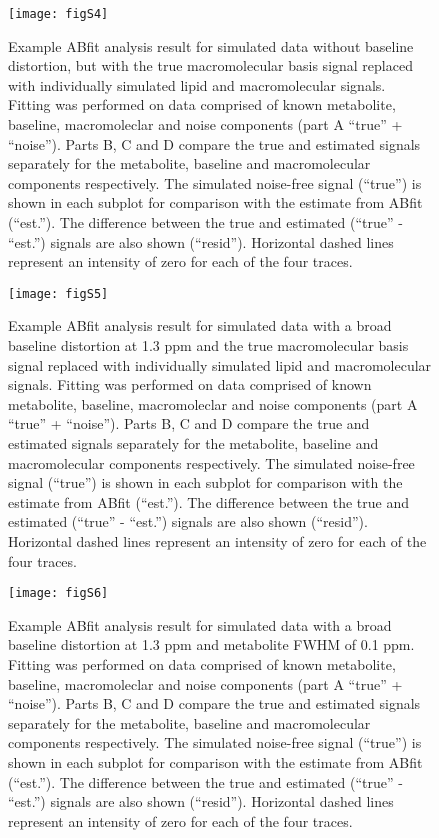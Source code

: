 \documentclass[num-refs]{wiley-article}
\begin{document}
\begin{figure}
  \begin{center}
    \texttt{[image: figS4]}
    \caption{Example ABfit analysis result for simulated data without baseline distortion, but with the true macromolecular basis signal replaced with individually simulated lipid and macromolecular signals. Fitting was performed on data comprised of known metabolite, baseline, macromoleclar and noise components (part A ``true'' + ``noise''). Parts B, C and D compare the true and estimated signals separately for the metabolite, baseline and macromolecular components respectively. The simulated noise-free signal (``true'') is shown in each subplot for comparison with the estimate from ABfit (``est.''). The difference between the true and estimated (``true'' - ``est.'') signals are also shown (``resid''). Horizontal dashed lines represent an intensity of zero for each of the four traces.}
  \end{center}
\end{figure}

\begin{figure}
  \begin{center}
    \texttt{[image: figS5]}
    \caption{Example ABfit analysis result for simulated data with a broad baseline distortion at 1.3 ppm and the true macromolecular basis signal replaced with individually simulated lipid and macromolecular signals. Fitting was performed on data comprised of known metabolite, baseline, macromoleclar and noise components (part A ``true'' + ``noise''). Parts B, C and D compare the true and estimated signals separately for the metabolite, baseline and macromolecular components respectively. The simulated noise-free signal (``true'') is shown in each subplot for comparison with the estimate from ABfit (``est.''). The difference between the true and estimated (``true'' - ``est.'') signals are also shown (``resid''). Horizontal dashed lines represent an intensity of zero for each of the four traces.}
  \end{center}
\end{figure}

\begin{figure}
  \begin{center}
    \texttt{[image: figS6]}
    \caption{Example ABfit analysis result for simulated data with a broad baseline distortion at 1.3 ppm and metabolite FWHM of 0.1 ppm. Fitting was performed on data comprised of known metabolite, baseline, macromoleclar and noise components (part A ``true'' + ``noise''). Parts B, C and D compare the true and estimated signals separately for the metabolite, baseline and macromolecular components respectively. The simulated noise-free signal (``true'') is shown in each subplot for comparison with the estimate from ABfit (``est.''). The difference between the true and estimated (``true'' - ``est.'') signals are also shown (``resid''). Horizontal dashed lines represent an intensity of zero for each of the four traces.}
  \end{center}
\end{figure}
\end{document}

